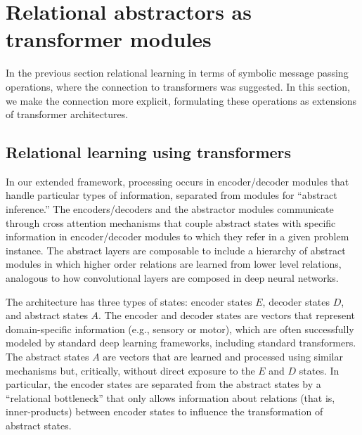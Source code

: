

\section{Relational abstractors as transformer modules}

In the previous section relational learning 
in terms of symbolic message passing operations, where the connection to transformers 
was suggested. In this section, we make the connection more explicit, formulating 
these operations as extensions of transformer architectures.



\subsection{Relational learning using transformers}

In our extended framework, processing occurs in encoder/decoder modules that handle particular types of information, separated from modules for ``abstract inference.'' The encoders/decoders and the abstractor modules communicate through cross attention mechanisms that couple abstract states with specific information in encoder/decoder modules to which they refer in a given problem instance.  The abstract layers are composable to include a hierarchy of abstract modules in which higher order relations are learned from lower level relations, analogous to how convolutional layers are composed in deep neural networks.

The architecture has three types of states: encoder states $E$, decoder states $D$, and abstract states $A$. The encoder and decoder states are vectors
that represent domain-specific information (e.g., sensory or motor), which are often successfully modeled  
by standard deep learning frameworks, including standard transformers. The abstract states $A$ are vectors 
that are learned and processed using similar mechanisms but, critically, without direct exposure to the $E$ and $D$ states.  In particular, the encoder states are separated from the abstract states by a ``relational bottleneck'' 
that only allows information about relations (that is, inner-products) between encoder 
states to influence the transformation of abstract states.

